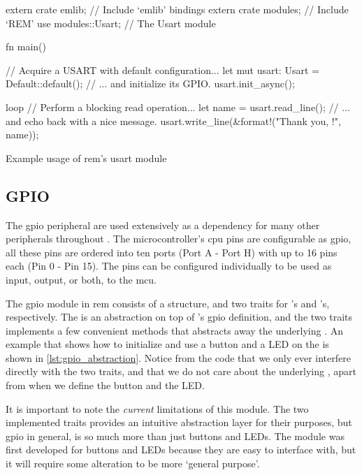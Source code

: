 \begin{listing}[H]
  \begin{rustcode}
extern crate emlib;   // Include `emlib' bindings
extern crate modules; // Include `REM'
use modules::Usart;   // The Usart module

fn main() {
  // Acquire a USART with default configuration...
  let mut usart: Usart = Default::default();
  // ... and initialize its GPIO.
  usart.init_async();

  loop {
    // Perform a blocking read operation...
    let name = usart.read_line();
    // ... and echo back with a nice message.
    usart.write_line(&format!("Thank you, {}!", name));
  }
}
  \end{rustcode}
  \caption{Example usage of \gls{rem}'s \gls{usart} module}
  \label{lst:usart_abstraction}
\end{listing}

\subsection{GPIO} %
\label{ssub:gpio}

The \gls{gpio} peripheral are used extensively as a dependency for many other peripherals throughout {\emlib}.
The microcontroller's \gls{cpu} pins are configurable as \gls{gpio}, all these pins are ordered into ten ports (Port A - Port H) with up to 16 pins each (Pin 0 - Pin 15).
The pins can be configured individually to be used as input, output, or both, to the \gls{mcu}.

The \gls{gpio} module in \gls{rem} consists of a  structure, and two traits for 's and 's, respectively.
The  is an abstraction on top of {\emlib}'s \gls{gpio} definition, and the two traits implements a few convenient methods that abstracts away the underlying .
An example that shows how to initialize and use a button and a LED on the {\STK} is shown in \autoref{lst:gpio_abstraction}.
Notice from the code that we only ever interfere directly with the two traits, and that we do not care about the underlying , apart from when we define the button and the LED.

It is important to note the \emph{current} limitations of this module.
The two implemented traits provides an intuitive abstraction layer for their purposes, but \gls{gpio} in general, is so much more than just buttons and LEDs.
The module was first developed for buttons and LEDs because they are easy to interface with, but it will require some alteration to be more `general purpose'.


